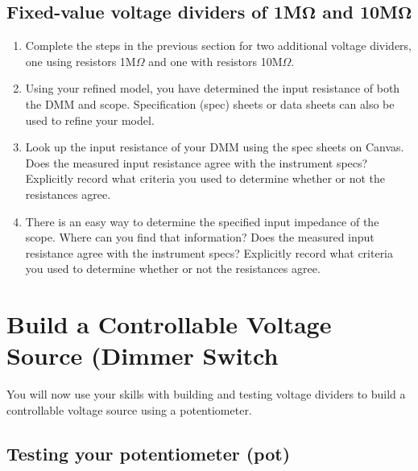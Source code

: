 \documentclass[10pt]{PhysLab1C} %
\begin{document}
\subsection{Fixed-value voltage dividers of 1M\texorpdfstring{$\boldsymbol{\Omega}$}{ohm} and 10M\texorpdfstring{$\boldsymbol{\Omega}$}{ohm}}

\begin{enumerate}
\def\labelenumi{\arabic{enumi}.}
\item
  Complete the steps in the previous section for two additional voltage
  dividers, one using resistors 1M$\Omega$ and one with
  resistors 10M$\Omega$.
\item
  Using your refined model, you have determined the input resistance of
  both the DMM and scope. Specification (spec) sheets or data sheets can
  also be used to refine your model.
\item
  Look up the input resistance of your DMM using the spec sheets on
  Canvas. Does the measured input resistance agree with the instrument
  specs? Explicitly record what criteria you used to determine whether
  or not the resistances agree.
\item
  There is an easy way to determine the specified input impedance of the
  scope. Where can you find that information? Does the measured input
  resistance agree with the instrument specs? Explicitly record what
  criteria you used to determine whether or not the resistances agree.
\end{enumerate}


\section{Build a Controllable Voltage Source (Dimmer Switch}

You will now use your skills with building and testing voltage dividers
to build a controllable voltage source using a potentiometer.

\subsection{Testing your potentiometer (pot)}
\end{document}
